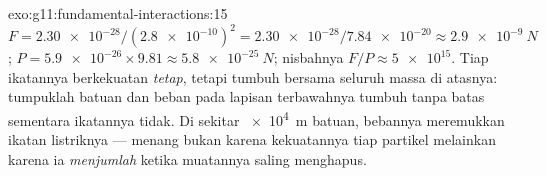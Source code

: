\begin{solution}{exo:g11:fundamental-interactions:15}
$F = \num{2.30e-28}/(\num{2.8e-10})^2 = \num{2.30e-28}/\num{7.84e-20}
\approx \qty{2.9e-9}{N}$; 
$P = \num{5.9e-26} \times 9.81 \approx \qty{5.8e-25}{N}$; nisbahnya
$F/P \approx \num{5e15}$. Tiap ikatannya berkekuatan \emph{tetap},
tetapi  tumbuh bersama seluruh massa di atasnya: tumpuklah
batuan dan beban pada lapisan terbawahnya tumbuh tanpa batas sementara
ikatannya tidak. Di sekitar \qty{e4}{m} batuan, bebannya meremukkan
ikatan listriknya ---  menang bukan karena kekuatannya tiap
partikel melainkan karena ia \emph{menjumlah} ketika muatannya saling
menghapus.
\end{solution}

